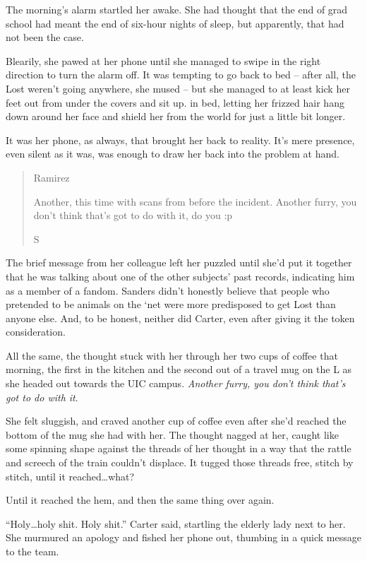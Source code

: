 \secdiv

The morning's alarm startled her awake.  She had thought that the end of grad school had meant the end of six-hour nights of sleep, but apparently, that had not been the case.

Blearily, she pawed at her phone until she managed to swipe in the right direction to turn the alarm off.  It was tempting to go back to bed -- after all, the Lost weren't going anywhere, she mused -- but she managed to at least kick her feet out from under the covers and sit up.  in bed, letting her frizzed hair hang down around her face and shield her from the world for just a little bit longer.

It was her phone, as always, that brought her back to reality.  It's mere presence, even silent as it was, was enough to draw her back into the problem at hand.

\begin{quotation}
  Ramirez

  Another, this time with scans from before the incident.  Another furry, you don't think that's got to do with it, do you :p

  S
\end{quotation}

The brief message from her colleague left her puzzled until she'd put it together that he was talking about one of the other subjects' past records, indicating him as a member of a fandom.  Sanders didn't honestly believe that people who pretended to be animals on the `net were more predisposed to get Lost than anyone else.  And, to be honest, neither did Carter, even after giving it the token consideration.

All the same, the thought stuck with her through her two cups of coffee that morning, the first in the kitchen and the second out of a travel mug on the L as she headed out towards the UIC campus.  \textit{Another furry, you don't think that's got to do with it}.

She felt sluggish, and craved another cup of coffee even after she'd reached the bottom of the mug she had with her.  The thought nagged at her, caught like some spinning shape against the threads of her thought in a way that the rattle and screech of the train couldn't displace.  It tugged those threads free, stitch by stitch, until it reached\ldots{}what?

Until it reached the hem, and then the same thing over again.

``Holy\ldots{}holy shit.  Holy shit.'' Carter said, startling the elderly lady next to her.  She murmured an apology and fished her phone out, thumbing in a quick message to the team.
